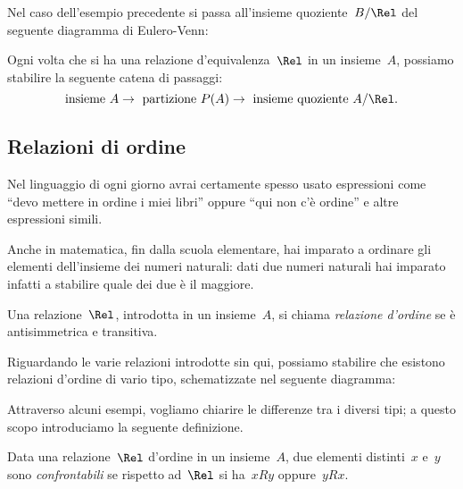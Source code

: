 Nel caso dell'esempio precedente si passa all'insieme quoziente~$B/\Rel$ del 
seguente diagramma di Eulero-Venn:
\begin{center}
 
\end{center}


\osservazione Ogni volta che si ha una relazione d'equivalenza~$\Rel$ in un 
insieme~$A$, possiamo stabilire la seguente
catena di passaggi:
 \[\text{insieme }A\rightarrow\text{ partizione }P(A)\rightarrow\text{ insieme 
quoziente }A/\Rel.\]



\subsection{Relazioni di ordine}
\label{subsec:rel_ordine}

Nel linguaggio di ogni giorno avrai certamente spesso usato espressioni come 
``devo mettere in ordine i miei
libri'' oppure ``qui non c'è ordine'' e altre espressioni simili.

Anche in matematica, fin dalla scuola elementare, hai imparato a ordinare gli 
elementi dell'insieme dei
numeri naturali: dati due numeri naturali hai imparato infatti a stabilire quale 
dei due è il maggiore.

\begin{definizione}
Una relazione~$\Rel$, introdotta in un insieme~$A$, si chiama \emph{relazione 
d'ordine} se è antisimmetrica e transitiva.
\end{definizione}

Riguardando le varie relazioni introdotte sin qui, possiamo stabilire che 
esistono relazioni d'ordine di vario tipo, schematizzate nel seguente diagramma:
\begin{center}
 
\end{center}

Attraverso alcuni esempi, vogliamo chiarire le differenze tra i diversi tipi; a 
questo scopo introduciamo la seguente definizione.

\begin{definizione}
Data una relazione~$\Rel$ d'ordine in un insieme~$A$, due elementi distinti~$x$ 
e~$y$ sono \emph{confrontabili} se rispetto ad~$\Rel$ si ha~$x R y$ oppure~$y R 
x$.
\end{definizione}

